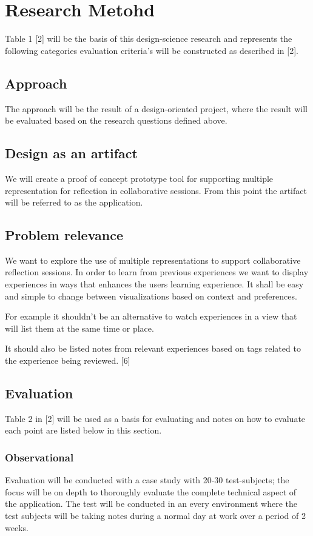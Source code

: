 \chapter{Research Metohd}
Table 1 [2] will be the basis of this design-science research and represents the following categories evaluation criteria’s will be constructed as described in [2].
\section{Approach}
The approach will be the result of a design-oriented project, where the result will be evaluated based on the research questions defined above.
\section{Design as an artifact}
We will create a proof of concept prototype tool for supporting multiple representation for reflection in collaborative sessions. From this point the artifact will be referred to as the application.
\section{Problem relevance}
We want to explore the use of multiple representations to support collaborative reflection sessions. In order to learn from previous experiences we want to display experiences in ways that enhances the users learning experience. It shall be easy and simple to change between visualizations based on context and preferences. 

For example it shouldn’t be an alternative to watch experiences in a view that will list them at the same time or place.

It should also be listed notes from relevant experiences based on tags related to the experience being reviewed. [6]
\section{Evaluation}
Table 2 in [2] will be used as a basis for evaluating and notes on how to evaluate each point are listed below in this section.
\subsection{Observational}
Evaluation will be conducted with a case study with 20-30 test-subjects; the focus will be on depth to thoroughly evaluate the complete technical aspect of the application. The test will be conducted in an every environment where the test subjects will be taking notes during a normal day at work over a period of 2 weeks.

